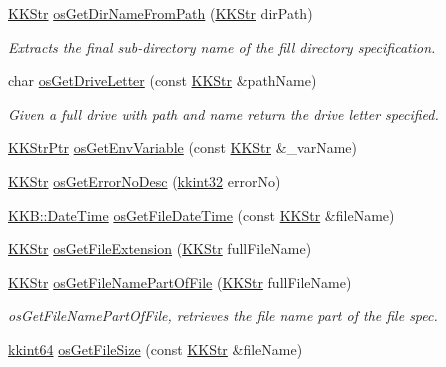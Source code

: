\begin{DoxyCompactItemize}
\item 
\hyperlink{class_k_k_b_1_1_k_k_str}{K\+K\+Str} \hyperlink{namespace_k_k_b_af86669af0e2f8e908ff421076c16c3cf}{os\+Get\+Dir\+Name\+From\+Path} (\hyperlink{class_k_k_b_1_1_k_k_str}{K\+K\+Str} dir\+Path)
\begin{DoxyCompactList}\small\item\em Extracts the final sub-\/directory name of the fill directory specification. \end{DoxyCompactList}\item 
char \hyperlink{namespace_k_k_b_a27f37c6a894a82bd5bcf884d899c82a1}{os\+Get\+Drive\+Letter} (const \hyperlink{class_k_k_b_1_1_k_k_str}{K\+K\+Str} \&path\+Name)
\begin{DoxyCompactList}\small\item\em Given a full drive with path and name return the drive letter specified. \end{DoxyCompactList}\item 
\hyperlink{namespace_k_k_b_a9adbef5a6b3be0867f5570df2a08f388}{K\+K\+Str\+Ptr} \hyperlink{namespace_k_k_b_a79021cf399003101255658938ec63065}{os\+Get\+Env\+Variable} (const \hyperlink{class_k_k_b_1_1_k_k_str}{K\+K\+Str} \&\+\_\+var\+Name)
\item 
\hyperlink{class_k_k_b_1_1_k_k_str}{K\+K\+Str} \hyperlink{namespace_k_k_b_aacc3362e3ec7e09539a36c07d99b5a04}{os\+Get\+Error\+No\+Desc} (\hyperlink{namespace_k_k_b_a8fa4952cc84fda1de4bec1fbdd8d5b1b}{kkint32} error\+No)
\item 
\hyperlink{class_k_k_b_1_1_date_time}{K\+K\+B\+::\+Date\+Time} \hyperlink{namespace_k_k_b_a0c28dcf4ba36d924a50454c84aee3931}{os\+Get\+File\+Date\+Time} (const \hyperlink{class_k_k_b_1_1_k_k_str}{K\+K\+Str} \&file\+Name)
\item 
\hyperlink{class_k_k_b_1_1_k_k_str}{K\+K\+Str} \hyperlink{namespace_k_k_b_ac66b0fee156008ea19ba4a0068378743}{os\+Get\+File\+Extension} (\hyperlink{class_k_k_b_1_1_k_k_str}{K\+K\+Str} full\+File\+Name)
\item 
\hyperlink{class_k_k_b_1_1_k_k_str}{K\+K\+Str} \hyperlink{namespace_k_k_b_ae128a00ca792cab37e76e428481aaaae}{os\+Get\+File\+Name\+Part\+Of\+File} (\hyperlink{class_k_k_b_1_1_k_k_str}{K\+K\+Str} full\+File\+Name)
\begin{DoxyCompactList}\small\item\em os\+Get\+File\+Name\+Part\+Of\+File, retrieves the file name part of the file spec. \end{DoxyCompactList}\item 
\hyperlink{namespace_k_k_b_aa3486b1c5ea9162b3b020c69f72826eb}{kkint64} \hyperlink{namespace_k_k_b_ad8935a22e6d051db404cc315a674e7f5}{os\+Get\+File\+Size} (const \hyperlink{class_k_k_b_1_1_k_k_str}{K\+K\+Str} \&file\+Name)

\end{DoxyCompactItemize}
